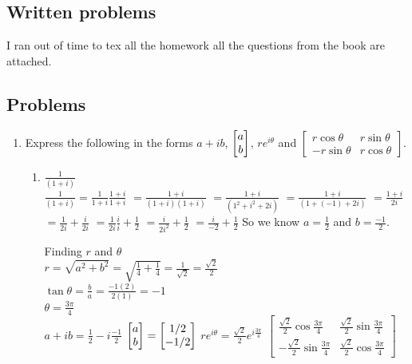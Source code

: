\documentclass[11pt]{article}
\numberwithin{equation}{section}
\begin{document}

\subsection*{Written problems}
I ran out of time to tex all the homework all the questions from the book are attached.
\subsection*{Problems}

\begin{enumerate}
\item Express the following in the forms $a+ib$, $\left[\begin{array}{@{}c@{}} a\\ b\end{array}\right]$, $re^{i\theta}$ and $\left[\begin{array}{cc} r\cos\theta & r\sin\theta\\ -r\sin\theta & r\cos\theta\end{array}\right]$.
\begin{enumerate}
\item $\frac{1}{(1+i)}$\\[.5cm]
$\frac{1}{(1+i)} = \frac{1}{1+i}\frac{1+i}{1+i}$
$= \frac{1+i}{(1+i)(1+i)}$
$= \frac{1+i}{(1^2+i^2+2i)}$
$= \frac{1+i}{(1+(-1)+2i)}$
$= \frac{1+i}{2i}$
$= \frac{1}{2i} + \frac{i}{2i}$
$= \frac{1}{2i}\frac{i}{i} + \frac{1}{2}$
$= \frac{i}{2i^2} + \frac{1}{2}$
$= \frac{i}{-2} + \frac{1}{2}$
So we know $a = \frac{1}{2}$ and $b = \frac{-1}{2}$. 

Finding $r$ and $\theta$\\
$r = \sqrt{a^2 + b^2} = \sqrt{\frac{1}{4}+\frac{1}{4}} = \frac{1}{\sqrt{2}} = \frac{\sqrt{2}}{2}$\\
$\tan{\theta} = \frac{b}{a} = \frac{-1 (2)}{2 (1)} = -1$\\
$\theta = \frac{3\pi}{4}$\\
$a+ib = \frac{1}{2} - i\frac{-1}{2}$
$\left[\begin{array}{@{}c@{}} a\\ b\end{array}\right] = \left[\begin{array}{@{}c@{}} 1/2\\ -1/2\end{array}\right]$
$re^{i\theta} = \frac{\sqrt{2}}{2}e^{i\frac{3\pi}{4}}$
$\left[\begin{array}{cc} \frac{\sqrt{2}}{2}\cos\frac{3\pi}{4}& \frac{\sqrt{2}}{2}\sin\frac{3\pi}{4}\\ -\frac{\sqrt{2}}{2}\sin\frac{3\pi}{4}& \frac{\sqrt{2}}{2}\cos\frac{3\pi}{4}\end{array}\right]$



\end{enumerate}
\end{enumerate}
\end{document}
